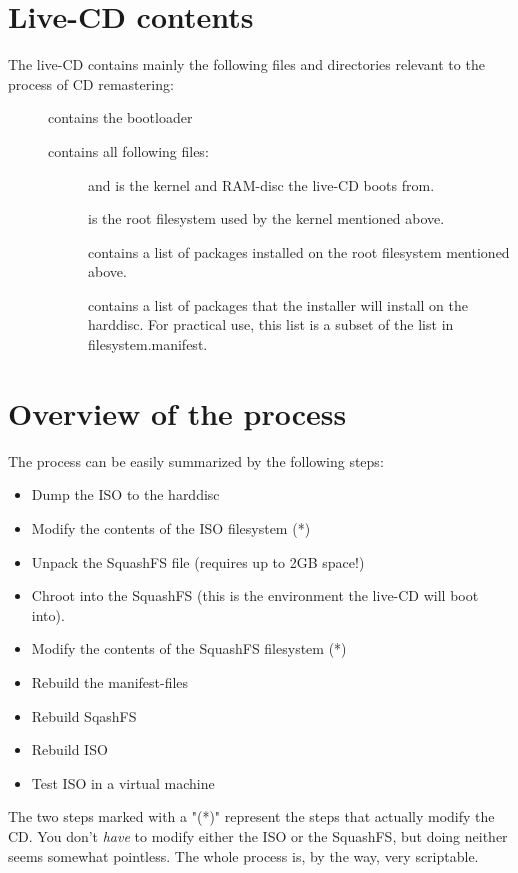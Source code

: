 \section{Live-CD contents}
The \tunix{} live-CD contains mainly the following files and directories relevant
to the process of CD remastering:
\begin{description}
  \item[] contains the bootloader
  \item[] contains all following files:
  \begin{description}
    \item[] and \textbf{} is the kernel and RAM-disc
      the live-CD boots from.
    \item[] is the root filesystem used by the kernel
      mentioned above.
    \item[] contains a list of packages installed on the
      root filesystem mentioned above.
    \item[] contains a list of packages that the
      installer will install on the harddisc. For practical use, this list is a
      subset of the list in filesystem.manifest.
  \end{description}
\end{description}

\section{Overview of the process}
The process can be easily summarized by the following steps:
\begin{itemize}
  \item Dump the ISO to the harddisc
  \item Modify the contents of the ISO filesystem (*)
  \item Unpack the SquashFS file (requires up to 2GB space!)
  \item Chroot into the SquashFS (this is the environment the live-CD will boot
    into).
  \item Modify the contents of the SquashFS filesystem (*)
  \item Rebuild the manifest-files
  \item Rebuild SqashFS
  \item Rebuild ISO
  \item Test ISO in a virtual machine
\end{itemize}
The two steps marked with a "(*)" represent the steps that actually modify the
CD. You don't \emph{have} to modify either the ISO or the SquashFS, but doing
neither seems somewhat pointless. The whole process is, by the way, very
scriptable.

